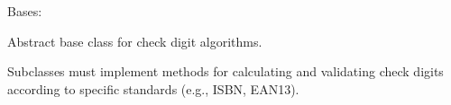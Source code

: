 \documentclass[letterpaper,10pt,english]{sphinxmanual}
\begin{document}
\begin{fulllineitems}
\label{\detokenize{apache_commons_validator_python.routines.checkdigit:apache_commons_validator_python.routines.checkdigit.abstract_checkdigit.AbstractCheckDigit}}
\pysigstartsignatures
{}
\pysigstopsignatures
\sphinxAtStartPar
Bases: 

\sphinxAtStartPar
Abstract base class for check digit algorithms.

\sphinxAtStartPar
Subclasses must implement methods for calculating and validating check digits
according to specific standards (e.g., ISBN, EAN\sphinxhyphen{}13).

\end{fulllineitems}
\end{document}

